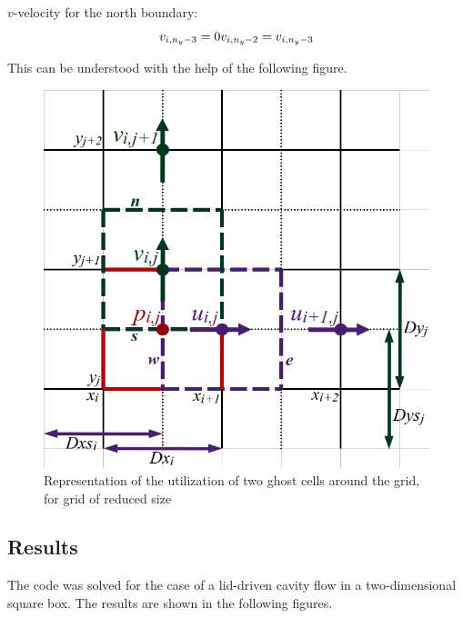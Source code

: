 \documentclass[12pt,a4paper,fleqn]{article}
\begin{document}
\(v\)-velocity for the north boundary:
\begin{equation}
v_{i,n_y-3} = 0\\
v_{i,n_y-2} = v_{i,n_y-3}
\end{equation}

This can be understood with the help of the following figure.

\begin{figure}[H]
    \centering
    \includegraphics[width=0.9\linewidth]{../figures/grid_staggered.png}
    \caption{Representation of the utilization of two ghost cells around the grid, for grid of reduced size}
\end{figure}

\subsection{Results}
The code was solved for the case of a lid-driven cavity flow in a two-dimensional square box. The results are shown in the following figures.
\end{document}

